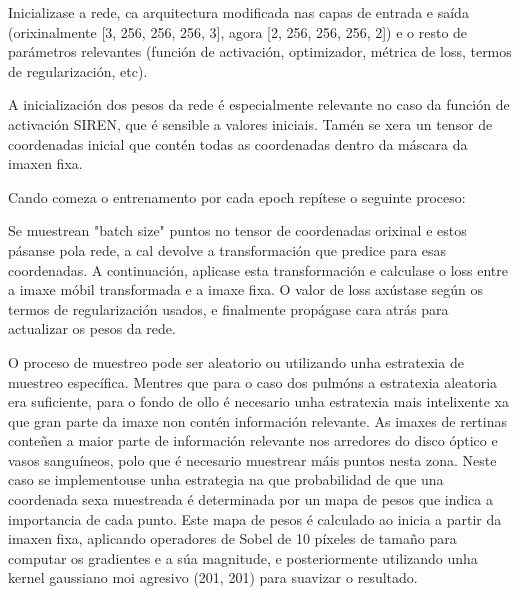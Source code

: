 Inicializase a rede, ca arquitectura modificada nas capas de entrada e saída 
(orixinalmente [3, 256, 256, 256, 3], agora [2, 256, 256, 256, 2]) 
e o resto de parámetros relevantes (función de activación, optimizador, métrica de loss, termos de regularización, etc).

A inicialización dos pesos da rede é especialmente relevante no caso da función de activación SIREN, que é sensible a valores iniciais.
Tamén se xera un tensor de coordenadas inicial que contén todas as coordenadas dentro da máscara da imaxen fixa.

Cando comeza o entrenamento por cada epoch repítese o seguinte proceso:

Se muestrean "batch size" puntos no tensor de coordenadas orixinal e estos pásanse pola rede, 
a cal devolve a transformación que predice para esas coordenadas.
A continuación, aplicase esta transformación e calculase o loss entre a imaxe móbil transformada e a imaxe fixa.
O valor de loss axústase según os termos de regularización usados, e finalmente propágase cara atrás para actualizar os pesos da rede.

O proceso de muestreo pode ser aleatorio ou utilizando unha estratexia de muestreo específica.
Mentres que para o caso dos pulmóns a estratexia aleatoria era suficiente, para o fondo de ollo é necesario unha estratexia mais intelixente xa que gran parte da imaxe non contén información relevante.
As imaxes de rertinas conteñen a maior parte de información relevante nos arredores do disco óptico e vasos sanguíneos, polo que é necesario muestrear máis puntos nesta zona.
Neste caso se implementouse unha estrategia na que probabilidad de que una coordenada sexa muestreada é determinada por un mapa de pesos que indica a importancia de cada punto.
Este mapa de pesos é calculado ao inicia a partir da imaxen fixa, aplicando operadores de Sobel de 10 píxeles de tamaño para computar os gradientes e a súa magnitude, e posteriormente utilizando unha kernel gaussiano moi agresivo (201, 201) para suavizar o resultado.
